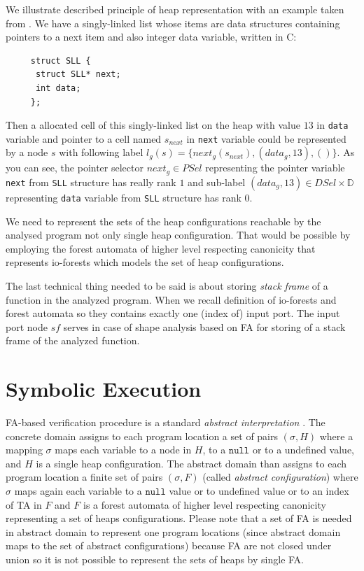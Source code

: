 We illustrate described principle of heap representation with an example taken from \cite{techrep}.
We have a singly-linked list whose items are data structures containing pointers to
a next item and also integer data variable, written in C:
\begin{center}
\begin{minipage}{0.3\textwidth}
    \begin{verbatim}
     struct SLL {
      struct SLL* next;
      int data;
     };
    \end{verbatim}
\end{minipage}
\end{center}
Then a allocated cell of this singly-linked list on the heap with value $13$ in \texttt{data} variable and pointer to a cell named $s_{next}$
in \texttt{next} variable could be represented
by a node $s$ with following label $l_g(s) = \{next_g(s_{next}),(data_g,13),()\}$.
As you can see, the pointer selector $next_g \in PSel$ representing the pointer variable \texttt{next} from \texttt{SLL} structure
has really rank $1$ and sub-label $(data_g,13) \in DSel\times \mathbb{D}$ representing \texttt{data} variable from \texttt{SLL} structure
has rank $0$.

We need to represent the sets of the heap configurations reachable by the analysed program not only single heap configuration.
That would be possible by employing the forest automata of higher level respecting canonicity that represents io-forests
which models the set of heap configurations.

The last technical thing needed to be said is about storing \emph{stack frame} of a function in the analyzed program.
When we recall definition of io-forests and forest automata so they contains exactly one (index of) input port.
The input port node $sf$ serves in case of shape analysis based on FA for storing of a stack frame of the analyzed function.

\section{Symbolic Execution}
\label{sec:se}

FA-based verification procedure is a standard \emph{abstract interpretation} \cite{cousot:77}.
The concrete domain assigns to each program location a set of pairs
$(\sigma,H)$ where a mapping $\sigma$ maps each variable
to a node in $H$, to a $\texttt{null}$ or to a undefined value, and $H$ is a single heap configuration.
The abstract domain than assigns to each program location a finite set of pairs
$(\sigma, F)$ (called \emph{abstract configuration}) where $\sigma$ maps again each variable to a
$\texttt{null}$ value or to undefined value or to an index of TA in $F$ and $F$ is a forest automata
of higher level respecting canonicity representing a set of heaps configurations.
Please note that a set of FA is needed in abstract domain to represent one program locations (since
abstract domain maps to the set of abstract configurations) because FA are not closed under union so it
is not possible to represent the sets of heaps by single FA.


